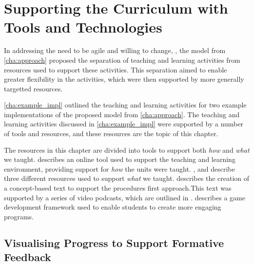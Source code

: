 
\chapter{Supporting the Curriculum with Tools and Technologies} %
\label{cha:supporting}

\graphicspath{{Figures/Supporting/}}

In addressing the need to be agile and willing to change, , the model from \cref{cha:approach} proposed the separation of teaching and learning activities from resources used to support these activities. This separation aimed to enable greater flexibility in the activities, which were then supported by more generally targetted resources.

\cref{cha:example_impl} outlined the teaching and learning activities for two example implementations of the proposed model from \cref{cha:approach}. The teaching and learning activities discussed in \cref{cha:example_impl} were supported by a number of tools and resources, and these resources are the topic of this chapter.

The resources in this chapter are divided into tools to support both \emph{how} and \emph{what} we taught.  describes an online tool used to support the teaching and learning environment, providing support for \emph{how} the units were taught. ,  and  describe three different resources used to support \emph{what} we taught.  describes the creation of a concept-based text to support the procedures first approach.This text was supported by a series of video podcasts, which are outlined in .  describes a game development framework used to enable students to create more engaging programs.


\section{Visualising Progress to Support Formative Feedback} %
\label{sec:doubtfire}


